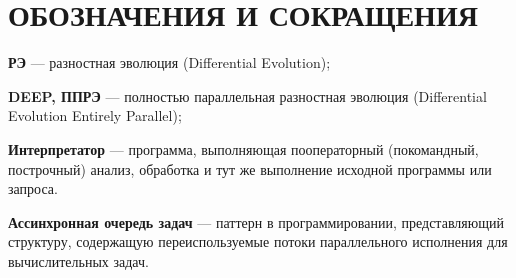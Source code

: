 \chapter*{ОБОЗНАЧЕНИЯ И СОКРАЩЕНИЯ}

\textbf{РЭ} --- разностная эволюция (Differential Evolution);

\textbf{DEEP, ППРЭ} --- полностью параллельная разностная эволюция (Differential Evolution Entirely Parallel);

\textbf{Интерпретатор} --- программа, выполняющая пооператорный (покомандный, построчный) анализ, обработка и тут же выполнение исходной программы или запроса.

\textbf{Ассинхронная очередь задач} --- 
паттерн в программировании,
представляющий структуру,
содержащую переиспользуемые
потоки параллельного исполнения
для вычислительных задач.
